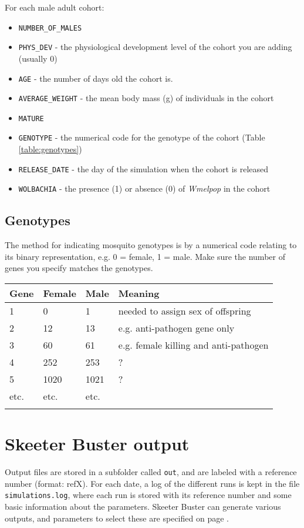 \documentclass[11pt]{article}
\newcommand{\linecmd}[1]{\texttt{#1}}
\begin{document}
For each male adult cohort:

\begin{itemize}
	\item \linecmd{NUMBER\_OF\_MALES}
	\item \linecmd{PHYS\_DEV} - the physiological development level of the cohort you are adding (usually 0)
	\item \linecmd{AGE} - the number of days old the cohort is.
	\item \linecmd{AVERAGE\_WEIGHT} - the mean body mass (g) of individuals in the cohort
	\item \linecmd{MATURE}
	\item \linecmd{GENOTYPE} - the numerical code for the genotype of the cohort (Table \ref{table:genotypes})
	\item \linecmd{RELEASE\_DATE} - the day of the simulation when the cohort is released
	\item \linecmd{WOLBACHIA} - the presence (1) or absence (0) of \emph{Wmelpop} in the cohort
\end{itemize}

\subsection{Genotypes}
The method for indicating mosquito genotypes is by a numerical code relating to its binary representation, e.g. 0 = female, 1 = male. Make sure the number of genes you specify matches the genotypes.

\begin{tabular}[h]{llll}
\hline{}
Gene & Female & Male & Meaning\\
\hline{}1 & 0 & 1 & needed to assign sex of offspring\\
2 & 12 & 13 & e.g. anti-pathogen gene only\\
3 & 60 & 61 & e.g. female killing and anti-pathogen\\
4 & 252 & 253 & ?\\	
5 & 1020 & 1021 & ?\\	
etc. & etc. & etc. &  \\
\hline
\label{table:genotypes}
\end{tabular}

\section{Skeeter Buster output}
Output files are stored in a subfolder called \linecmd{out}, and are labeled with a reference number (format: refX). For each date, a log of the different runs is kept in the file \linecmd{simulations.log}, where each run is stored with its reference number and some basic information about the parameters. Skeeter Buster can generate various outputs, and parameters to select these are specified on page \pageref{OutputOptions}.
\end{document}
